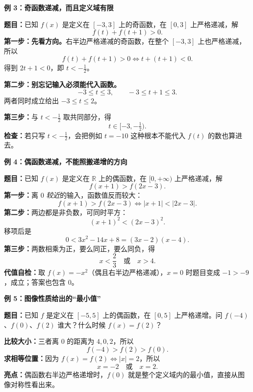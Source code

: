 \clearpage
\begin{examplebox}
\textbf{\textcolor{CExample}{例 3：奇函数递减，而且定义域有限}}



\textbf{题目：}已知 $f(x)$ 是定义在 $[-3,3]$ 上的奇函数，在 $[0,3]$ 上严格递减，解
\[
 f(t)+f(t+1)>0.
\]
\textbf{第一步：先看方向。}右半边严格递减的奇函数，在整个 $[-3,3]$ 上也严格递减，所以
\[
 f(t)+f(t+1)>0\iff t+(t+1)<0.
\]
得到 $2t+1<0$，即 $t<-\frac12$。

\textbf{第二步：别忘记输入必须能代入函数。}
\[
 -3\leqslant t\leqslant3,\qquad -3\leqslant t+1\leqslant3.
\]
两者同时成立给出 $-3\leqslant t\leqslant2$。

\textbf{第三步：}与 $t<-\frac12$ 取共同部分，得
\[
\boxed{t\in[-3,-\tfrac12)}.
\]
\textbf{检查：}若只写 $t<-\frac12$，会把例如 $t=-10$ 这种根本不能代入 $f(t)$ 的数也算进去。

\medskip

\end{examplebox}
\clearpage
\begin{examplebox}
\textbf{\textcolor{CExample}{例 4：偶函数递减，不能照搬递增的方向}}



\textbf{题目：}已知 $f(x)$ 是定义在 $\mathbb R$ 上的偶函数，在 $[0,+\infty)$ 上严格递减，解
\[
 f(x+1)>f(2x-3).
\]
\textbf{第一步：}离 $0$ \emph{较近}的输入，函数值反而较大：
\[
 f(x+1)>f(2x-3)\iff |x+1|<|2x-3|.
\]
\textbf{第二步：}两边都是非负数，可同时平方：
\[
 (x+1)^2<(2x-3)^2.
\]
移项后是
\[
 0<3x^2-14x+8=(3x-2)(x-4).
\]
\textbf{第三步：}两数相乘为正，要么同正，要么同负，得
\[
\boxed{x<\frac23\quad\text{或}\quad x>4}.
\]
\textbf{代值自检：}取 $f(x)=-x^2$（偶且右半边严格递减），$x=0$ 时题目变成 $-1>-9$，成立；答案也包含 $0$。

\medskip

\end{examplebox}
\clearpage
\begin{examplebox}
\textbf{\textcolor{CExample}{例 5：图像性质给出的“最小值”}}



\textbf{题目：}已知 $f$ 是定义在 $[-5,5]$ 上的偶函数，在 $[0,5]$ 上严格递增。问 $f(-4)$、$f(0)$、$f(2)$ 谁大？什么时候 $f(x)=f(2)$？

\textbf{比较大小：}三者离 $0$ 的距离为 $4,0,2$，所以
\[
\boxed{f(-4)>f(2)>f(0)}.
\]
\textbf{求相等位置：}因为 $f(x)=f(2)\iff |x|=2$，所以
\[
\boxed{x=-2\quad\text{或}\quad x=2}.
\]
\textbf{亮点：}偶函数右半边严格递增时，$f(0)$ 就是整个定义域内的最小值，直接从图像对称性看出来。

\medskip

\end{examplebox}
